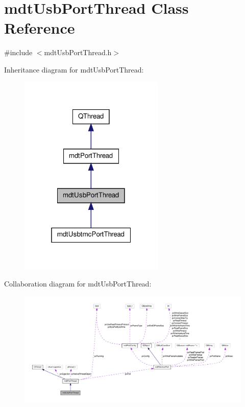 \hypertarget{classmdt_usb_port_thread}{\section{mdt\-Usb\-Port\-Thread Class Reference}
\label{classmdt_usb_port_thread}
}


{\ttfamily \#include $<$mdt\-Usb\-Port\-Thread.\-h$>$}



Inheritance diagram for mdt\-Usb\-Port\-Thread\-:
\nopagebreak
\begin{figure}[H]
\begin{center}
\leavevmode
\includegraphics[width=196pt]{classmdt_usb_port_thread__inherit__graph}
\end{center}
\end{figure}


Collaboration diagram for mdt\-Usb\-Port\-Thread\-:
\nopagebreak
\begin{figure}[H]
\begin{center}
\leavevmode
\includegraphics[width=350pt]{classmdt_usb_port_thread__coll__graph}
\end{center}
\end{figure}
